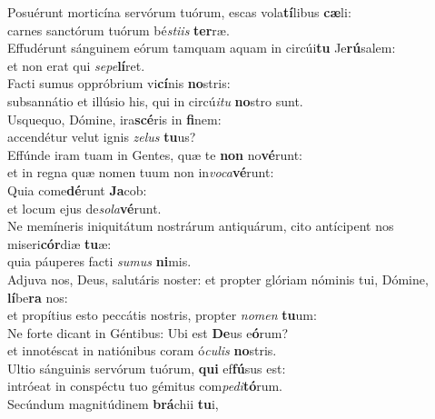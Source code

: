 \evenverse Posuérunt morticína servórum tuórum, escas vola\textbf{tí}libus \textbf{cæ}li:~\*\\
\evenverse carnes sanctórum tuórum bé\textit{sti}\textit{is} \textbf{ter}ræ.\\
\oddverse Effudérunt sánguinem eórum tamquam aquam in circúi\textbf{tu} Je\textbf{rú}salem:~\*\\
\oddverse et non erat qui \textit{se}\textit{pe}\textbf{lí}ret.\\
\evenverse Facti sumus oppróbrium vi\textbf{cí}nis \textbf{no}stris:~\*\\
\evenverse subsannátio et illúsio his, qui in circú\textit{i}\textit{tu} \textbf{no}stro sunt.\\
\oddverse Usquequo, Dómine, ira\textbf{scé}ris in \textbf{fi}nem:~\*\\
\oddverse accendétur velut ignis \textit{ze}\textit{lus} \textbf{tu}us?\\
\evenverse Effúnde iram tuam in Gentes, quæ te \textbf{non} no\textbf{vé}runt:~\*\\
\evenverse et in regna quæ nomen tuum non in\textit{vo}\textit{ca}\textbf{vé}runt:\\
\oddverse Quia come\textbf{dé}runt \textbf{Ja}cob:~\*\\
\oddverse et locum ejus de\textit{so}\textit{la}\textbf{vé}runt.\\
\evenverse Ne memíneris iniquitátum nostrárum antiquárum, cito antícipent nos miseri\textbf{cór}diæ \textbf{tu}æ:~\*\\
\evenverse quia páuperes facti \textit{su}\textit{mus} \textbf{ni}mis.\\
\oddverse Adjuva nos, Deus, salutáris noster: et propter glóriam nóminis tui, Dómine, \textbf{lí}be\textbf{ra} nos:~\*\\
\oddverse et propítius esto peccátis nostris, propter \textit{no}\textit{men} \textbf{tu}um:\\
\evenverse Ne forte dicant in Géntibus: Ubi est \textbf{De}us e\textbf{ó}rum?~\*\\
\evenverse et innotéscat in natiónibus coram ó\textit{cu}\textit{lis} \textbf{no}stris.\\
\oddverse Ultio sánguinis servórum tuórum, \textbf{qui} ef\textbf{fú}sus est:~\*\\
\oddverse intróeat in conspéctu tuo gémitus com\textit{pe}\textit{di}\textbf{tó}rum.\\
\evenverse Secúndum magnitúdinem \textbf{brá}chii \textbf{tu}i,~\*\\
